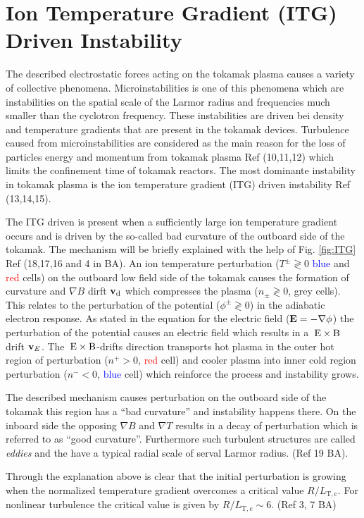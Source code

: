 \newpage

\section{Ion Temperature Gradient (ITG) Driven Instability}
\label{sec:ITG}

The described electrostatic forces acting on the tokamak plasma causes a variety of collective phenomena. Microinstabilities is one of this phenomena which are instabilities on the spatial scale of the Larmor radius and frequencies much smaller than the cyclotron frequency. These instabilities are driven bei density and temperature gradients that are present in the tokamak devices. Turbulence caused from microinstabilities are considered as the main reason for the loss of particles energy and momentum from tokamak plasma Ref (10,11,12) which limits the confinement time of tokamak reactors. The most dominante instability in tokamak plasma is the ion temperature gradient (ITG) driven instability Ref (13,14,15). 


The ITG driven is present when a sufficiently large ion temperature gradient occurs and is driven by the so-called bad curvature of the outboard side of the tokamak. The mechanism will be briefly explained with the help of Fig. \ref{fig:ITG} Ref (18,17,16 and 4 in BA). An ion temperature perturbation ($T^\pm \gtrless 0$ \textcolor{blue}{blue} and \textcolor{red}{red} cells) on the outboard low field side of the tokamak causes the formation of curvature and $\nabla B$ dirft $\boldsymbol{\mathbf{v}}_\mathrm{d}$ which compresses the plasma ($n_\pm \gtrless 0$, grey cells). This relates to the perturbation of the potential ($\phi^\pm  \gtrless 0$) in the adiabatic electron response. As stated in the equation for the electric field ($\boldsymbol{\mathbf{E}} = -\nabla \phi$) the perturbation of the potential causes an electric field which results in a $\mathrm{\:E}\times\mathrm{B}$ drift $\boldsymbol{\mathbf{v}}_E$. The $\mathrm{\:E}\times\mathrm{B}$-drifts direction transports hot plasma in the outer hot region of perturbation ($n^+ > 0$, \textcolor{red}{red} cell) and cooler plasma into inner cold region perturbation ($n^- < 0$, \textcolor{blue}{blue} cell) which reinforce the process and instability grows. 

The described mechanism causes perturbation on the outboard side of the tokamak this region has a \enquote{bad curvature} and instability happens there. On the inboard side the opposing $\nabla B$ and $\nabla T$ results in a decay of perturbation which is referred to as \enquote{good curvature}. Furthermore such turbulent structures are called \textit{eddies} and the have a typical radial scale of serval Larmor radius. (Ref 19 BA). \bigskip

Through the explanation above is clear that the initial perturbation is growing when the normalized temperature gradient overcomes a critical value $R/L_\mathrm{T,c}$. For nonlinear turbulence the critical value is given by $R/L_\mathrm{T,c} \sim 6$. (Ref 3, 7 BA)